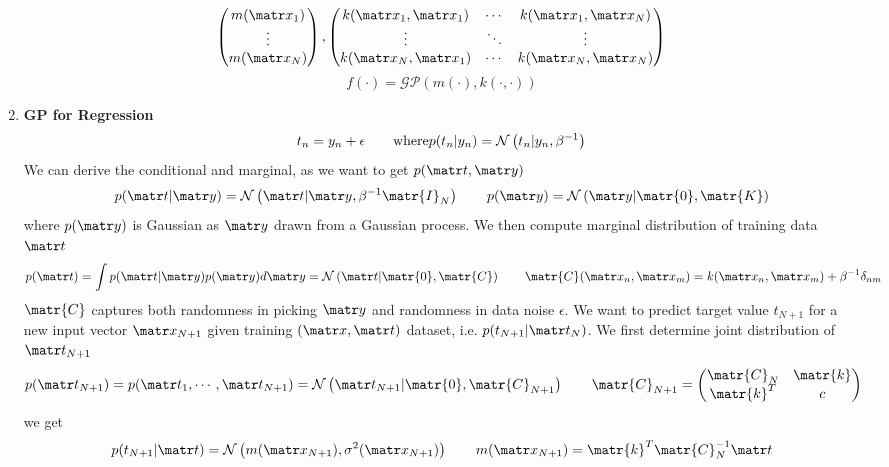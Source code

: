 \documentclass[11pt]{article}
\begin{document}
\begin{defn*}
\begin{enumerate}
\[{            \begin{pmatrix}
                m(\bx_1) \\
                \vdots \\
                m(\bx_N) \\ 
            \end{pmatrix}
            , 
            \begin{pmatrix}
                k(\bx_1, \bx_1) & \cdots & k(\bx_1, \bx_N) \\ 
                \vdots & \ddots & \vdots \\
                k(\bx_N, \bx_1) & \cdots & k(\bx_N, \bx_N) \\ 
            \end{pmatrix}
            } 
        \]
        \[
            f(\cdot) = \mathcal{GP}(m(\cdot), k(\cdot, \cdot))
        \]
        \item \textbf{GP for Regression} 
        \[
            t_n = y_n + \epsilon 
            \qquad \text{where}
            p(t_n | y_n) = \mathcal{N}\left(t_n | y_n, \beta^{-1}\right)
        \]
        We can derive the conditional and marginal, as we want to get $p(\bt, \by)$
        \[
            p(\bt| \by) = \normal{\bt|\by , \beta^{-1} \matr{I}_N}    
            \qquad 
            p(\by) = \normal{\by | \matr{0}, \matr{K}}
        \]
        where $p(\by)$ is Gaussian as $\by$ drawn from a Gaussian process. We then compute marginal distribution of training data $\bt$
        \[
            p(\bt) = \int p(\bt | \by) p(\by) d\by = \normal{\bt | \matr{0}, \matr{C}}    
            \qquad 
            \matr{C}(\bx_n, \bx_m) = k(\bx_n, \bx_m) + \beta^{-1} \delta_{nm}
        \]
        $\matr{C}$ captures both randomness in picking $\by$ and randomness in data noise $\epsilon$. We want to predict target value $t_{N+1}$ for a new input vector $\bx_{N+1}$ given training $(\bx, \bt)$ dataset, i.e. $p(t_{N+1}|\bt_N)$. We first determine joint distribution of $\bt_{N+1}$ 
        \[
            p(\bt_{N+1}) = p(\bt_1, \cdots, \bt_{N+1}) = \normal{\bt_{N+1} | \matr{0}, \matr{C}_{N+1}}
            \qquad 
            \matr{C}_{N+1} = 
            \begin{pmatrix}
                \matr{C}_N & \matr{k} \\
                \matr{k}^T & c \\ 
            \end{pmatrix}
        \]
        we get 
        \[
            p(t_{N+1}|\bt) = \normal{m(\bx_{N+1}), \sigma^2(\bx_{N+1})}
            \qquad 
            m(\bx_{N+1}) = \matr{k}^T \matr{C}_N^{-1} \bt 
\]
\end{enumerate}
\end{defn*}
\end{document}
